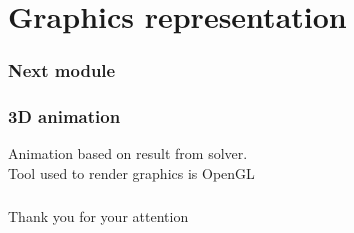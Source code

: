 \documentclass{beamer}
\begin{document}
    \section{Graphics representation}
    \frame
    {
        \frametitle{Next module}
        \tableofcontents[currentsection]
    }
    \frame
    {
        \frametitle{3D animation}
        Animation based on result from solver.\\
        Tool used to render graphics is OpenGL\\
    }

    \frame
    {
        \frametitle{}
        Thank you for your attention
    }
\end{document}
